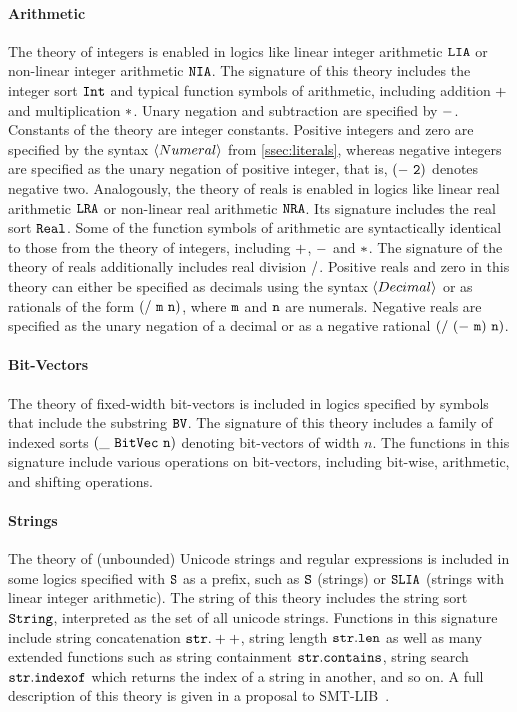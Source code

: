 \documentclass[english,a4paper,10pt]{article}
\begin{document}
\paragraph{Arithmetic}
The theory of integers is enabled 
in logics like linear integer arithmetic ${\tt LIA}$
or non-linear integer arithmetic ${\tt NIA}$.
The signature of this theory includes the integer sort ${\tt Int}$ and
typical function symbols of arithmetic, including
addition ${\tt +}$
and multiplication ${\tt *}$.
Unary negation and subtraction are specified by ${\tt -}$.
Constants of the theory are integer constants.
Positive integers and zero are specified by the syntax $\left\langle Numeral\right\rangle$ from \cref{ssec:literals},
whereas negative integers are specified as the unary negation of positive integer,
that is, ${\tt (-\ 2)}$ denotes negative two.
Analogously, 
the theory of reals is enabled
in logics like linear real arithmetic ${\tt LRA}$
or non-linear real arithmetic ${\tt NRA}$.
Its signature includes the real sort ${\tt Real}$.
Some of the function symbols of arithmetic are syntactically identical to
those from the theory of integers, including
${\tt +}$, ${\tt -}$ and ${\tt *}$.
The signature of the theory of reals additionally includes
real division ${\tt /}$.
Positive reals and zero in this theory can either be specified as
decimals using the syntax $\left\langle Decimal\right\rangle$
or as rationals of the form ${\tt (/\ m\ n)}$,
where ${\tt m}$ and ${\tt n}$ are numerals.
Negative reals are specified as the unary negation of a decimal
or as a negative rational ${\tt (/\ (-\ m)\ n)}$.

\paragraph{Bit-Vectors}
The theory of fixed-width bit-vectors
is included in logics specified 
by symbols that include the substring ${\tt BV}$.
The signature of this theory includes a family of 
indexed sorts ${\tt (\_\ BitVec\ n)}$
denoting bit-vectors of width $n$.
The functions in this signature include various operations on bit-vectors,
including bit-wise, arithmetic, and shifting operations.

\paragraph{Strings}
The theory of (unbounded) Unicode strings and regular expressions
is included in some logics specified with ${\tt S}$ as a prefix,
such as ${\tt S}$ (strings) or ${\tt SLIA}$ (strings
with linear integer arithmetic).
The string of this theory includes the string sort ${\tt String}$,
interpreted as the set of all unicode strings.
Functions in this signature include string concatenation ${\tt str.++}$,
string length ${\tt str.len}$ as well as many extended functions
such as string containment ${\tt str.contains}$,
string search ${\tt str.indexof}$ which returns the index of
a string in another, and so on.
A full description of this theory is given in a proposal to SMT-LIB~\cite{smtlibStrings}.
\end{document}
